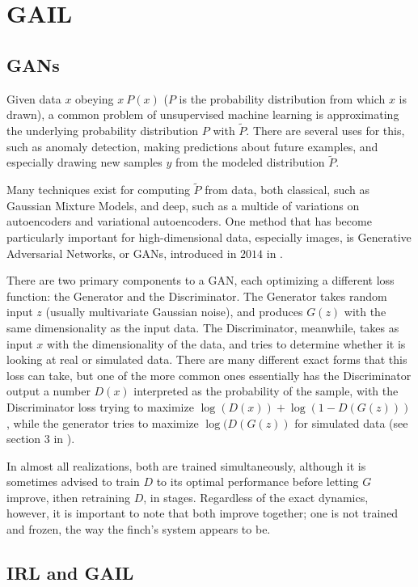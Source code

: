 \documentclass[aps,prl,preprint,groupedaddress]{revtex4-1}
\begin{document}
\section{GAIL}

\subsection{GANs}

Given data $x$ obeying $x ~ P(x)$ ($P$ is the probability distribution from which $x$ is drawn), 
a common problem of unsupervised machine learning is approximating 
the underlying probability distribution $P$ with $\widetilde{P}$. 
There are several uses for this, such as anomaly detection, making predictions about future examples, 
and especially drawing new samples $y$ from the modeled distribution $\widetilde{P}$.

Many techniques exist for computing $\widetilde{P}$ from data, both classical, such as Gaussian Mixture Models, 
and deep, such as a multide of variations on autoencoders and variational autoencoders. 
One method that has become particularly important for high-dimensional data, especially images, 
is Generative Adversarial Networks, or GANs, introduced in $2014$ in \cite{gan}.

There are two primary components to a GAN, each optimizing a different loss function: the Generator and the Discriminator. 
The Generator takes random input $z$ 
(usually multivariate Gaussian noise), and produces $G(z)$ with the same dimensionality as the input data. 
The Discriminator, meanwhile, takes as input $x$ with the dimensionality of the data, 
and tries to determine whether it is looking at real or simulated data. 
There are many different exact forms that this loss can take, 
but one of the more common ones essentially has the Discriminator output a number $D(x)$ 
interpreted as the probability of the sample, 
with the Discriminator loss trying to maximize $\log (D(x)) + \log (1 - D(G(z)))$,
while the generator tries to maximize $\log (D(G(z))$ for simulated data (see section $3$ in \cite{gan}).

In almost all realizations, both are trained simultaneously, 
although it is sometimes advised to train $D$ to its optimal performance before letting $G$ improve, 
ithen retraining $D$, in stages. 
Regardless of the exact dynamics, however, it is important to note that both improve together; 
one is not trained and frozen, the way the finch's system appears to be.

\subsection{IRL and GAIL}
\end{document}
